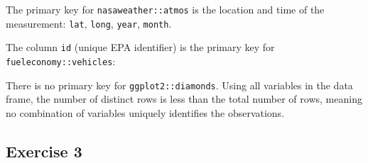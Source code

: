 \documentclass[]{book}
\newenvironment{Shaded}{\begin{snugshade}}{\end{snugshade}}
\newcommand{\CommentTok}[1]{\textcolor[rgb]{0.56,0.35,0.01}{\textit{#1}}}
\newcommand{\DecValTok}[1]{\textcolor[rgb]{0.00,0.00,0.81}{#1}}
\newcommand{\KeywordTok}[1]{\textcolor[rgb]{0.13,0.29,0.53}{\textbf{#1}}}
\newcommand{\NormalTok}[1]{#1}
\newcommand{\OperatorTok}[1]{\textcolor[rgb]{0.81,0.36,0.00}{\textbf{#1}}}
\newcommand{\StringTok}[1]{\textcolor[rgb]{0.31,0.60,0.02}{#1}}
\theoremstyle{plain}
\theoremstyle{remark}
\theoremstyle{definition}
\theoremstyle{definition}
\theoremstyle{definition}
\theoremstyle{remark}
\begin{document}
The primary key for \texttt{nasaweather::atmos} is the location and time
of the measurement: \texttt{lat}, \texttt{long}, \texttt{year},
\texttt{month}.

\begin{Shaded}
\end{Shaded}

The column \texttt{id} (unique EPA identifier) is the primary key for
\texttt{fueleconomy::vehicles}:

\begin{Shaded}
\end{Shaded}

There is no primary key for \texttt{ggplot2::diamonds}. Using all
variables in the data frame, the number of distinct rows is less than
the total number of rows, meaning no combination of variables uniquely
identifies the observations.

\begin{Shaded}
\end{Shaded}

\hypertarget{exercise-3-23}{%
\subsection{Exercise 3}\label{exercise-3-23}}
\end{document}
